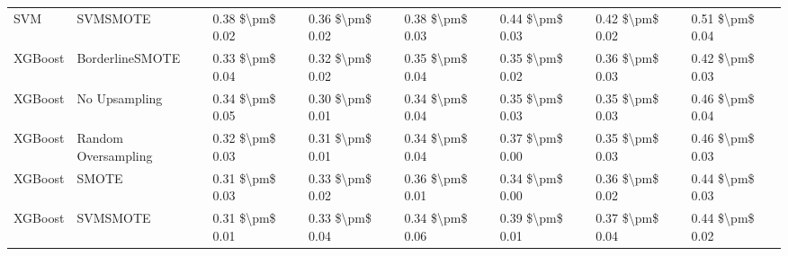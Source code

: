 \begin{tabular}{llllllll}
                            SVM &                      SVMSMOTE & 0.38 \$\textbackslash pm\$ 0.02 &           0.36 \$\textbackslash pm\$ 0.02 &       0.38 \$\textbackslash pm\$ 0.03 &        0.44 \$\textbackslash pm\$ 0.03 &                         0.42 \$\textbackslash pm\$ 0.02 &     0.51 \$\textbackslash pm\$ 0.04 \\
                        XGBoost &               BorderlineSMOTE & 0.33 \$\textbackslash pm\$ 0.04 &           0.32 \$\textbackslash pm\$ 0.02 &       0.35 \$\textbackslash pm\$ 0.04 &        0.35 \$\textbackslash pm\$ 0.02 &                         0.36 \$\textbackslash pm\$ 0.03 &     0.42 \$\textbackslash pm\$ 0.03 \\
                        XGBoost &                 No Upsampling & 0.34 \$\textbackslash pm\$ 0.05 &           0.30 \$\textbackslash pm\$ 0.01 &       0.34 \$\textbackslash pm\$ 0.04 &        0.35 \$\textbackslash pm\$ 0.03 &                         0.35 \$\textbackslash pm\$ 0.03 &     0.46 \$\textbackslash pm\$ 0.04 \\
                        XGBoost &           Random Oversampling & 0.32 \$\textbackslash pm\$ 0.03 &           0.31 \$\textbackslash pm\$ 0.01 &       0.34 \$\textbackslash pm\$ 0.04 &        0.37 \$\textbackslash pm\$ 0.00 &                         0.35 \$\textbackslash pm\$ 0.03 &     0.46 \$\textbackslash pm\$ 0.03 \\
                        XGBoost &                         SMOTE & 0.31 \$\textbackslash pm\$ 0.03 &           0.33 \$\textbackslash pm\$ 0.02 &       0.36 \$\textbackslash pm\$ 0.01 &        0.34 \$\textbackslash pm\$ 0.00 &                         0.36 \$\textbackslash pm\$ 0.02 &     0.44 \$\textbackslash pm\$ 0.03 \\
                        XGBoost &                      SVMSMOTE & 0.31 \$\textbackslash pm\$ 0.01 &           0.33 \$\textbackslash pm\$ 0.04 &       0.34 \$\textbackslash pm\$ 0.06 &        0.39 \$\textbackslash pm\$ 0.01 &                         0.37 \$\textbackslash pm\$ 0.04 &     0.44 \$\textbackslash pm\$ 0.02 \\
\bottomrule
\end{tabular}
